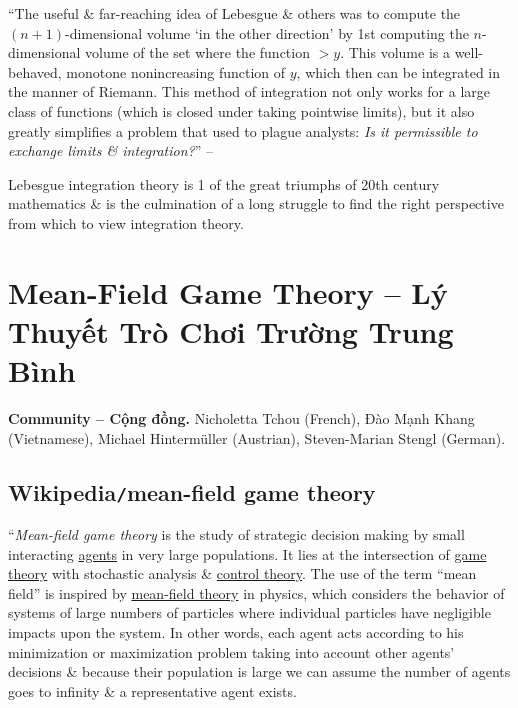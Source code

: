 \documentclass{article}
\begin{document}
``The useful \& far-reaching idea of Lebesgue \& others was to compute the $(n + 1)$-dimensional volume `in the other direction' by 1st computing the $n$-dimensional volume of the set where the function $> y$. This volume is a well-behaved, monotone nonincreasing function of $y$, which then can be integrated in the manner of Riemann. This method of integration not only works for a large class of functions (which is closed under taking pointwise limits), but it also greatly simplifies a problem that used to plague analysts: {\it Is it permissible to exchange limits \& integration?}'' -- \cite[Chap. 1, pp. 1--2]{Lieb_Loss2001}

Lebesgue integration theory is 1 of the great triumphs of 20th century mathematics \& is the culmination of a long struggle to find the right perspective from which to view integration theory.


\section{Mean-Field Game Theory -- Lý Thuyết Trò Chơi Trường Trung Bình}
\textbf{\textsf{Community -- Cộng đồng.}} {\sc Nicholetta Tchou (French), Đào Mạnh Khang (Vietnamese), Michael Hinterm\"uller (Austrian), Steven-Marian Stengl (German)}.

\subsection{Wikipedia{\tt/}mean-field game theory}
``{\it Mean-field game theory} is the study of strategic decision making by small interacting \href{https://en.wikipedia.org/wiki/Agent_(economics)}{agents} in very large populations. It lies at the intersection of \href{https://en.wikipedia.org/wiki/Game_theory}{game theory} with stochastic analysis \& \href{https://en.wikipedia.org/wiki/Control_theory}{control theory}. The use of the term ``mean field'' is inspired by \href{https://en.wikipedia.org/wiki/Mean-field_theory}{mean-field theory} in physics, which considers the behavior of systems of large numbers of particles where individual particles have negligible impacts upon the system. In other words, each agent acts according to his minimization or maximization problem taking into account other agents' decisions \& because their population is large we can assume the number of agents goes to infinity \& a representative agent exists.
\end{document}
